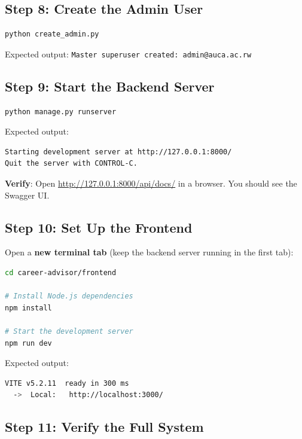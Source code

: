\documentclass[12pt, a4paper]{article}
\begin{document}
\subsection{Step 8: Create the Admin User}

\begin{lstlisting}[language=bash]
python create_admin.py
\end{lstlisting}

Expected output: \texttt{Master superuser created: admin@auca.ac.rw}

\subsection{Step 9: Start the Backend Server}

\begin{lstlisting}[language=bash]
python manage.py runserver
\end{lstlisting}

Expected output:
\begin{lstlisting}[language=bash]
Starting development server at http://127.0.0.1:8000/
Quit the server with CONTROL-C.
\end{lstlisting}

\textbf{Verify}: Open \url{http://127.0.0.1:8000/api/docs/} in a browser. You should see the Swagger UI.

\subsection{Step 10: Set Up the Frontend}

Open a \textbf{new terminal tab} (keep the backend server running in the first tab):

\begin{lstlisting}[language=bash]
cd career-advisor/frontend

# Install Node.js dependencies
npm install

# Start the development server
npm run dev
\end{lstlisting}

Expected output:
\begin{lstlisting}[language=bash]
  VITE v5.2.11  ready in 300 ms
  ->  Local:   http://localhost:3000/
\end{lstlisting}

\subsection{Step 11: Verify the Full System}
\end{document}
